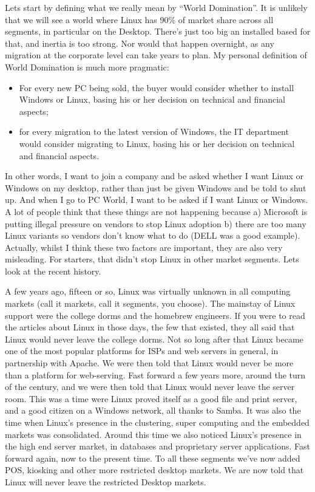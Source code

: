 \documentclass{book}
\begin{document}
Lets start by defining what we really mean by ``World Domination''. It
is unlikely that we will see a world where Linux has 90\% of market
share across all segments, in particular on the Desktop. There's just
too big an installed based for that, and inertia is too strong. Nor
would that happen overnight, as any migration at the corporate level
can take years to plan. My personal definition of World Domination is
much more pragmatic:

\begin{itemize}
\item For every new PC being sold, the buyer would consider whether to
  install Windows or Linux, basing his or her decision on technical
  and financial aspects;
\item for every migration to the latest version of Windows, the IT
  department would consider migrating to Linux, basing his or her
  decision on technical and financial aspects.
\end{itemize}

In other words, I want to join a company and be asked whether I want
Linux or Windows on my desktop, rather than just be given Windows and
be told to shut up. And when I go to PC World, I want to be asked if I
want Linux or Windows. A lot of people think that these things are not
happening because a) Microsoft is putting illegal pressure on vendors
to stop Linux adoption b) there are too many Linux variants so vendors
don't know what to do (DELL was a good example). Actually, whilst I
think these two factors are important, they are also very
misleading. For starters, that didn't stop Linux in other market
segments. Lets look at the recent history.

A few years ago, fifteen or so, Linux was virtually unknown in all
computing markets (call it markets, call it segments, you choose). The
mainstay of Linux support were the college dorms and the homebrew
engineers. If you were to read the articles about Linux in those days,
the few that existed, they all said that Linux would never leave the
college dorms. Not so long after that Linux became one of the most
popular platforms for ISPs and web servers in general, in partnership
with Apache. We were then told that Linux would never be more than a
platform for web-serving. Fast forward a few years more, around the
turn of the century, and we were then told that Linux would never
leave the server room. This was a time were Linux proved itself as a
good file and print server, and a good citizen on a Windows network,
all thanks to Samba. It was also the time when Linux's presence in the
clustering, super computing and the embedded markets was
consolidated. Around this time we also noticed Linux's presence in the
high end server market, in databases and proprietary server
applications. Fast forward again, now to the present time. To all
these segments we've now added POS, kiosking and other more restricted
desktop markets. We are now told that Linux will never leave the
restricted Desktop markets.
\end{document}

